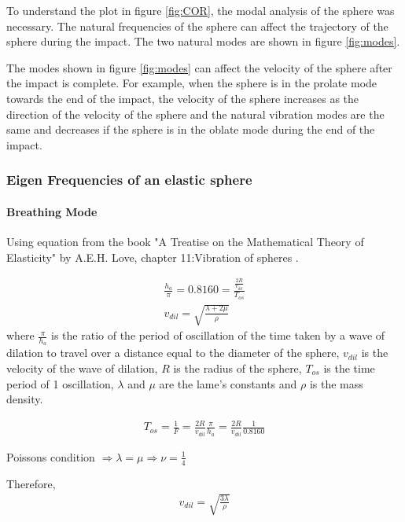 To understand the plot in figure \ref{fig:COR}, the modal analysis of the sphere was necessary. The natural frequencies of the sphere can affect the trajectory of the sphere during the impact. The two natural modes are shown in figure \ref{fig:modes}.

The modes shown in figure \ref{fig:modes} can affect the velocity of the sphere after the impact is complete. For example, when the sphere is in the prolate mode towards the end of the impact, the velocity of the sphere increases as the direction of the velocity of the sphere and the natural vibration modes are the same and decreases if the sphere is in the oblate mode during the end of the impact. 

\subsubsection{Eigen Frequencies of an elastic sphere}

\paragraph{Breathing Mode}

Using equation from the book "A Treatise on the Mathematical Theory of Elasticity" by A.E.H. Love, chapter 11:Vibration of spheres \citep{aelove}.

\begin{equation}
\begin{split}
\frac{h_{a}}{\pi} = 0.8160 = \frac{\frac{2R}{v_{dil}}}{T_{os}}\\
v_{dil} = \sqrt{\frac{\lambda + 2\mu}{\rho}}
\end{split}
\label{eq:eigen}
\end{equation} 
where $\frac{\pi}{h_{a}}$ is the ratio of the period of oscillation of the time taken by a wave of dilation to travel over a  distance equal to the diameter of the sphere, $v_{dil}$ is the velocity of the wave of dilation, $R$ is the radius of the sphere, $T_{os}$ is the time period of 1 oscillation, $\lambda$ and $\mu$ are the lame's constants and $\rho$ is the mass density.

\begin{align}
T_{os} = \frac{1}{F} = \frac{2R}{v_{dil}} \frac{\pi}{h_{a}} = \frac{2R}{v_{dil}} \frac{1}{0.8160}
\end{align}

Poissons condition $\Rightarrow \lambda = \mu \Rightarrow \nu=\frac{1}{4}$

Therefore,
\begin{align}
 v_{dil} = \sqrt{\frac{3\lambda}{\rho}}
\end{align}

